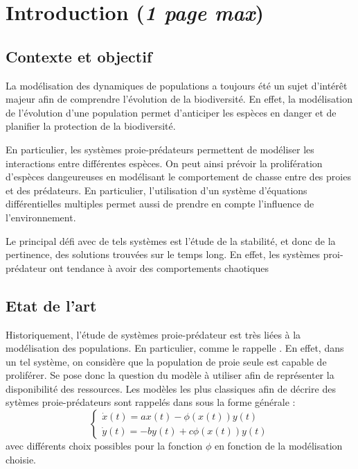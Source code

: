 \chapter{Introduction (\textit{1 page max})}
\label{ch:Introduction}


\section{Contexte et objectif}
\label{sec:Contexte}

La modélisation des dynamiques de populations a toujours été un sujet d'intérêt majeur afin de comprendre l'évolution de la biodiversité. En effet, la modélisation de l'évolution d'une population permet d'anticiper les espèces en danger et de planifier la protection de la biodiversité.

En particulier, les systèmes proie-prédateurs permettent de modéliser les interactions entre différentes espèces. On peut ainsi prévoir la prolifération d'espèces dangeureuses en modélisant le comportement de chasse entre des proies et des prédateurs. En particulier, l'utilisation d'un système d'équations différentielles multiples permet aussi de prendre en compte l'influence de l'environnement.

Le principal défi avec de tels systèmes est l'étude de la stabilité, et donc de la pertinence, des solutions trouvées sur le temps long. En effet, les systèmes proi-prédateur ont tendance à avoir des comportements chaotiques

\section{Etat de l’art}
\label{sec:Etat}

Historiquement, l'étude de systèmes proie-prédateur est très liées à la modélisation des populations. En particulier, comme le rappelle \cite{BrauerBiology}. En effet, dans un tel système, on considère que la population de proie seule est capable de proliférer. Se pose donc la question du modèle à utiliser afin de représenter la disponibilité des ressources.
Les modèles les plus classiques afin de décrire des sytèmes proie-prédateurs sont rappelés dans \cite{Holl2stoch} sous la forme générale :
\begin{equation}
    \begin{cases}
        \dot{x}(t) = a x(t) - \phi (x(t)) y(t) \\
        \dot{y}(t) = -b y(t) + c \phi (x(t)) y(t)
    \end{cases}
\end{equation}
avec différents choix possibles pour la fonction $\phi$ en fonction de la modélisation choisie.

